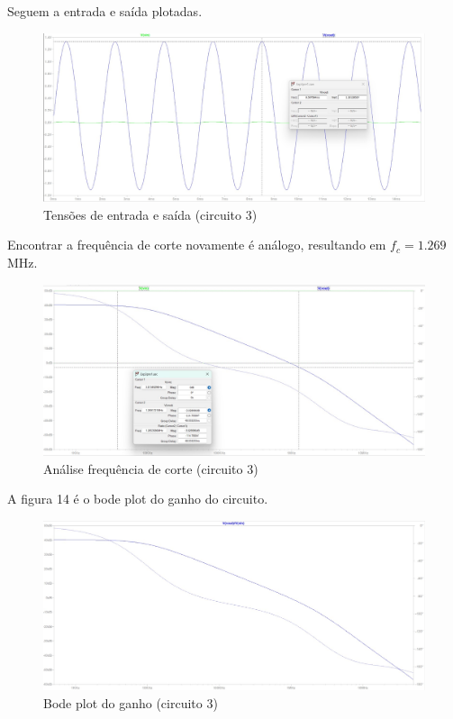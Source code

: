 \documentclass[10pt,twocolumn,letterpaper]{article}
\begin{document}
Seguem a entrada e saída plotadas.

\begin{figure}[h]
\caption{Tensões de entrada e saída (circuito 3)}
\begin{center}
\includegraphics[scale=0.15]{figuras/fig12}
\end{center}
\end{figure}

Encontrar a frequência de corte novamente é análogo, resultando em $f_c=1.269$MHz.

\begin{figure}[h]
\caption{Análise frequência de corte (circuito 3)}
\begin{center}
\includegraphics[scale=0.15]{figuras/fig13}
\end{center}
\end{figure}

A figura 14 é o bode plot do ganho do circuito.

\begin{figure}[h]
\caption{Bode plot do ganho (circuito 3)}
\begin{center}
\includegraphics[scale=0.15]{figuras/fig14}
\end{center}
\end{figure}
\end{document}

